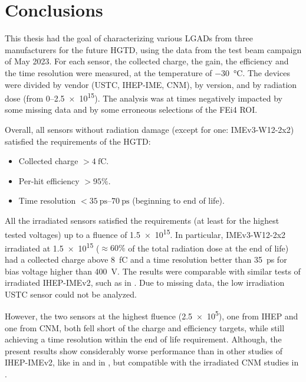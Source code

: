 \chapter*{Conclusions}\label{chap:conclusion}


This thesis had the goal of characterizing various LGADs from three manufacturers for the future HGTD, using the data from the test beam campaign of May 2023. For each sensor, the collected charge, the gain, the efficiency and the time resolution were measured, at the temperature of \qty{-30}{\degreeCelsius}. The devices were divided by vendor (USTC, IHEP-IME, CNM), by version, and by radiation dose (from \qtyrange{0}{2.5e15}{\neutroneq}). The analysis was at times negatively impacted by some missing data and by some erroneous selections of the FEi4 ROI.

Overall, all sensors without radiation damage (except for one: IMEv3-W12-2x2) satisfied the requirements of the HGTD:
\begin{itemize}
    \item Collected charge \(>\qty{4}{\femto\coulomb}\).
    \item Per-hit efficiency \(>95\%\).
    \item Time resolution \(<\qtyrange{35}{70}{\pico\second}\) (beginning to end of life).
\end{itemize}

All the irradiated sensors satisfied the requirements (at least for the highest tested voltages) up to a fluence of \qty{1.5e15}{\neutroneq}. In particular, IMEv3-W12-2x2 irradiated at \qty{1.5e15}{\neutroneq} (\(\approx60\%\) of the total radiation dose at the end of life) had a collected charge above \qty{8}{\femto\coulomb} and a time resolution better than \qty{35}{\pico\second} for bias voltage higher than \qty{400}{\volt}. The results were comparable with similar tests of irradiated IHEP-IMEv2, such as in \cite{Ali:2023roa}. Due to missing data, the low irradiation USTC sensor could not be analyzed.

However, the two sensors at the highest fluence (\qty{2.5e5}{\neutroneq}), one from IHEP and one from CNM, both fell short of the charge and efficiency targets, while still achieving a time resolution within the end of life requirement. Although, the present results show considerably worse performance than in other studies of IHEP-IMEv2, like in \cite{Ali:2023roa} and in \cite{Wu:2022ruu}, but compatible with the irradiated CNM studies in \cite{Agapopoulou_2022}. 

